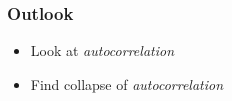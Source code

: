 \begin{frame}
    \frametitle{Outlook}
    \begin{itemize}
        \item Look at \emph{autocorrelation}
        \item Find collapse of \emph{autocorrelation}
    \end{itemize}

    

\end{frame}